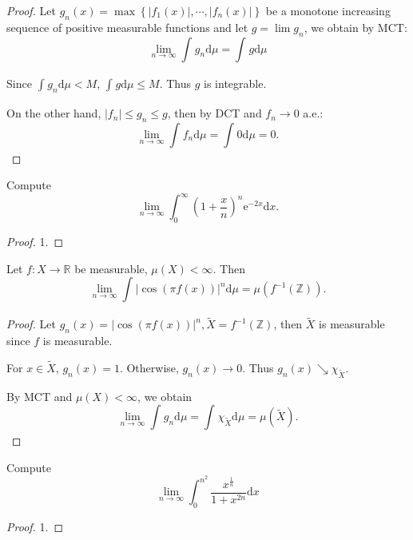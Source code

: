 \begin{proof}
	Let $
		g_n( x ) =\max \left\{ |f_1( x )| ,\cdots ,|f_n( x ) | \right\}
	$ be a monotone increasing sequence of positive measurable functions and let $ g=\lim g_{n} $, we obtain by MCT:
	$$
		\lim_{n\rightarrow \infty}\int_{}^{}{g_n\mathrm{d} \mu}=\int_{}^{}{g\mathrm{d} \mu}
	$$

	Since $
		\int_{}^{}{g_n\mathrm{d} \mu}<M
	$, $
		\int_{}^{}{g\mathrm{d} \mu}\le M
	$. Thus $ g $ is integrable.

	On the other hand, $
		|f_n|\le g_n\le g
	$, then by DCT and $ f_{n}\to 0 $ a.e.:
	$$
		\lim_{n\rightarrow \infty}\int_{}^{}{f_n\mathrm{d} \mu}=\int_{}^{}{0\mathrm{d} \mu}=0.
	$$
\end{proof}

\begin{problem}
Compute
$$
	\lim_{n\rightarrow \infty}\int_0^{\infty}\left( 1+\frac{x}{n} \right) ^n\text{e}^{-2x}\mathrm{d} x.
$$
\end{problem}

\begin{proof}
	1.
\end{proof}

\begin{problem}
Let $ f\colon X\to \mathbb{R}  $ be measurable, $ \mu(X)<\infty $. Then
$$
	\lim_{n\rightarrow \infty}\int_{}^{}{|\cos ( \pi f( x ) ) |^n\mathrm{d} \mu}=\mu ( f^{-1}( \mathbb{Z} ) ).
$$
\end{problem}

\begin{proof}
	Let $
		g_n( x ) =|\cos ( \pi f( x ) ) |^n,\tilde{X}=f^{-1}( \mathbb{Z} )
	$, then $ \tilde{X} $ is measurable since $ f $ is measurable.

	For $ x\in \tilde{X} $, $ g_{n}(x)=1 $. Otherwise, $ g_{n}(x)\to 0 $. Thus $ g_{n}(x)\searrow \chi_{\tilde{X}} $.

	By MCT and $ \mu(X)<\infty $, we obtain
	$$
		\lim_{n\rightarrow \infty}\int_{}^{}{g_n\mathrm{d} \mu}=\int_{}^{}{\chi _{\tilde{X}}\mathrm{d} \mu}=\mu ( \tilde{X} ).
	$$
\end{proof}

\begin{problem}
Compute
$$
	\lim_{n\rightarrow \infty}\int_0^{n^2}{\frac{x^{\frac{1}{n}}}{1+x^{2n}}\mathrm{d} x}
$$
\end{problem}

\begin{proof}
	1.
\end{proof}

